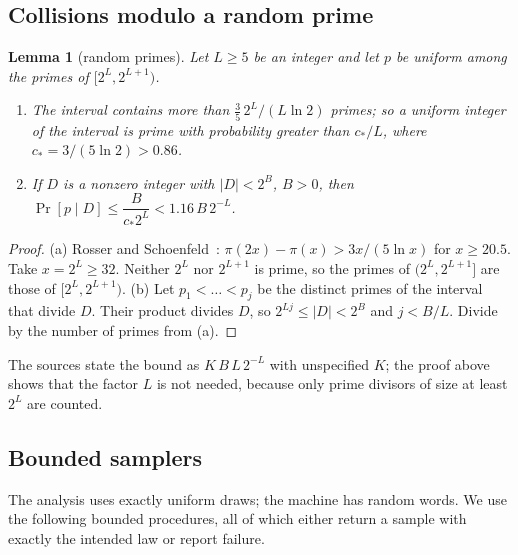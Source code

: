 \documentclass[11pt]{article}
\newtheorem{lemma}{Lemma}[section]
\theoremstyle{definition}
\newcommand{\abs}[1]{\lvert #1\rvert}
\begin{document}
\subsection{Collisions modulo a random prime}
\begin{lemma}[random primes]\label{lem:primes}
Let $L\ge5$ be an integer and let $p$ be uniform among the primes of $[2^L,2^{L+1})$.
\begin{enumerate}[label=\textup{(\alph*)}]
\item The interval contains more than $\tfrac35\,2^L/(L\ln2)$ primes; so a uniform integer of the interval is prime
with probability greater than $c_\ast/L$, where $c_\ast=3/(5\ln2)>0.86$.
\item If $D$ is a nonzero integer with $\abs D<2^B$, $B>0$, then $\Pr[p\mid D]\le\dfrac{B}{c_\ast2^{L}}<1.16\,B\,2^{-L}$.
\end{enumerate}
\end{lemma}
\begin{proof}
(a) Rosser and Schoenfeld~\cite[Corollary~3]{RS}: $\pi(2x)-\pi(x)>3x/(5\ln x)$ for $x\ge20.5$. Take $x=2^L\ge32$.
Neither $2^L$ nor $2^{L+1}$ is prime, so the primes of $(2^L,2^{L+1}]$ are those of $[2^L,2^{L+1})$. (b) Let
$p_1<\dots<p_j$ be the distinct primes of the interval that divide $D$. Their product divides $D$, so
$2^{Lj}\le\abs D<2^B$ and $j<B/L$. Divide by the number of primes from (a).
\end{proof}
The sources state the bound as $K\,B\,L\,2^{-L}$ with unspecified $K$; the proof above shows that the factor $L$ is
not needed, because only prime divisors of size at least $2^L$ are counted.

\subsection{Bounded samplers}\label{sec:samplers}
The analysis uses exactly uniform draws; the machine has random words. We use the following bounded procedures, all
of which either return a sample with exactly the intended law or report failure.
\end{document}
